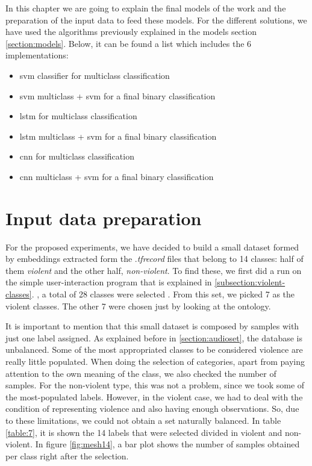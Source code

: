 
	In this chapter we are going to explain the final models of the work and the preparation of the input data to feed these models. For the different solutions, we have used the algorithms previously explained in the models section \ref{section:models}. Below, it can be found a list which includes the 6 implementations:
	
	\begin{itemize}
		\item \acrshort{svm} classifier for multiclass classification
		\item \acrshort{svm} multiclass + \acrshort{svm} for a final binary classification
		\item \acrshort{lstm} for multiclass classification
		\item \acrshort{lstm} multiclass + \acrshort{svm} for a final binary classification
		\item \acrshort{cnn} for multiclass classification
		\item \acrshort{cnn} multiclass + \acrshort{svm} for a final binary classification
	\end{itemize}
	

\section{Input data preparation}

	For the proposed experiments, we have decided to build a small dataset formed by embeddings extracted form the .\textit{tfrecord} files that belong to 14 classes: half of them \textit{violent} and the other half, \textit{non-violent}. To find these, we first did a run on the simple user-interaction program that is explained in \ref{subsection:violent-classes}. , a total of 28 classes were selected . From this set, we picked 7 as the violent classes. The other 7 were chosen just by looking at the ontology.
	
	It is important to mention that this small dataset is composed by samples with just one label assigned. As explained before in \ref{section:audioset}, the database is unbalanced. Some of the most appropriated classes to be considered violence are really little populated. When doing the selection of categories, apart from paying attention to the own meaning of the class, we also checked the number of samples. For the non-violent type, this was not a problem, since we took some of the most-populated labels. However, in the violent case, we had to deal with the condition of representing violence and also having enough observations. So, due to these limitations, we could not obtain a set naturally balanced. In table \ref{table:7}, it is shown the 14 labels that were selected divided in violent and non-violent. In figure \ref{fig:mesh14}, a bar plot shows the number of samples obtained per class right after the selection. 
	
